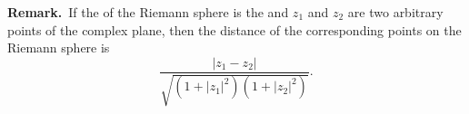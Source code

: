 \documentclass[12pt]{article}
\begin{document}
\textbf{Remark.}\, If the  of the Riemann sphere is the  and $z_1$ and $z_2$ are two arbitrary points of the complex plane, then the distance of the corresponding points on the Riemann sphere is
$$\frac{|z_1\!-\!z_2|}{\sqrt{(1\!+\!|z_1|^2)(1\!+\!|z_2|^2)}}.$$


\end{document}
